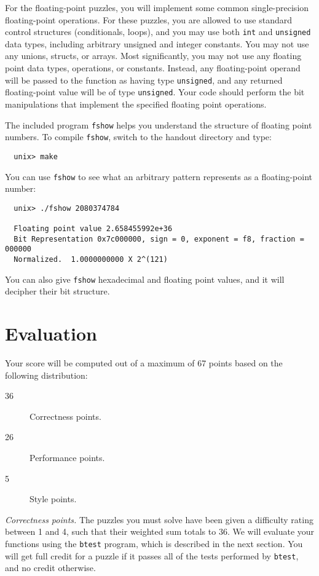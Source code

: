 \documentclass[11pt]{article}
\begin{document}
For the floating-point puzzles, you will implement some
common single-precision floating-point operations.  For these puzzles,
you are allowed to use standard control structures (conditionals,
loops), and you may use both {\tt int} and {\tt unsigned} data types,
including arbitrary unsigned and integer constants.  You may not use
any unions, structs, or arrays.  Most significantly, you may not use
any floating point data types, operations, or constants.  Instead, any
floating-point operand will be passed to the function as having type
{\tt unsigned}, and any returned floating-point value will be of type
{\tt unsigned}.  Your code should perform the bit manipulations that
implement the specified floating point operations.

The included program \texttt{fshow} helps you understand the structure
of floating point numbers. To compile \texttt{fshow}, switch to the
handout directory and type:
\begin{verbatim} 
  unix> make 
\end{verbatim}
You can use \texttt{fshow} to see what an arbitrary pattern 
represents as a floating-point number:
\begin{verbatim}
  unix> ./fshow 2080374784

  Floating point value 2.658455992e+36
  Bit Representation 0x7c000000, sign = 0, exponent = f8, fraction = 000000
  Normalized.  1.0000000000 X 2^(121)
\end{verbatim}
You can also give \texttt{fshow} hexadecimal and floating point
values, and it will decipher their bit structure.

\section{Evaluation}

Your score will be computed out of a maximum of 67 points based on the
following distribution:
\begin{description}
\item[36] Correctness points.
\item[26] Performance points.
\item[5] Style points.
\end{description}


{\em Correctness points.} The puzzles you must solve have been given a
difficulty rating between 1 and 4, such that their weighted sum totals
to 36.  We will evaluate your functions using the \texttt{btest}
program, which is described in the next section.  You will get full
credit for a puzzle if it passes all of the tests performed by
\texttt{btest}, and no credit otherwise.
\end{document}
